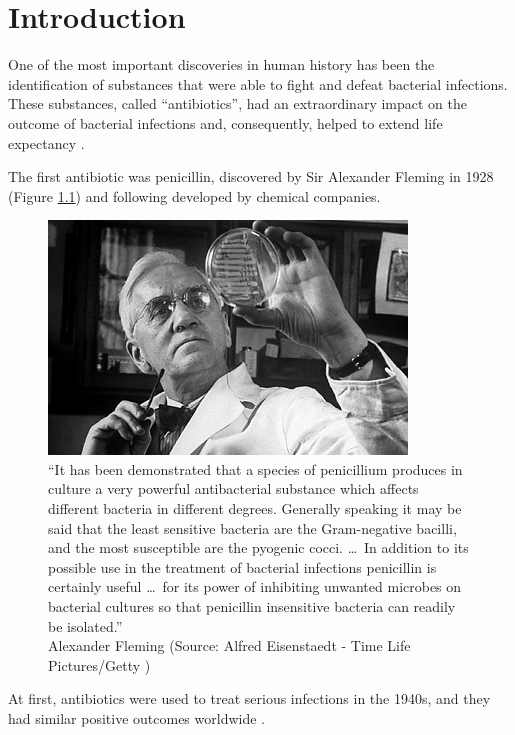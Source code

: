 \documentclass[11pt]{report}
\begin{document}
\tableofcontents

\chapter{Introduction}
One of the most important discoveries in human history has been the identification of substances that were able to fight and defeat bacterial infections.
These substances, called ``antibiotics'', had an extraordinary impact on the outcome of bacterial infections and, consequently, helped to extend life expectancy \cite{ventola2015antibiotic}.

The first antibiotic was penicillin, discovered by Sir Alexander Fleming in 1928 (Figure \ref{eisenstaedt}) and following developed by chemical companies.

\begin{figure}[htp]
\centering
\includegraphics[scale=1.10]{img/eisenstaedt.jpg}
\caption{``It has been demonstrated that a species of penicillium produces in culture a very powerful antibacterial substance which affects different bacteria in different degrees.
Generally speaking it may be said that the least sensitive bacteria are the Gram-negative bacilli, and the most susceptible are the pyogenic cocci. \ldots\ 
In addition to its possible use in the treatment of bacterial infections penicillin is certainly useful \ldots\ for its power of inhibiting unwanted microbes on bacterial cultures so that penicillin insensitive bacteria can readily be isolated.'' \cite{fleming1929antibacterial}\\
Alexander Fleming (Source: Alfred Eisenstaedt - Time Life Pictures/Getty \cite{eisenstaedt})}
\label{eisenstaedt}
\end{figure}

\clearpage
At first, antibiotics were used to treat serious infections in the 1940s, and they had similar positive outcomes worldwide \cite{spellberg2014}.
\end{document}
